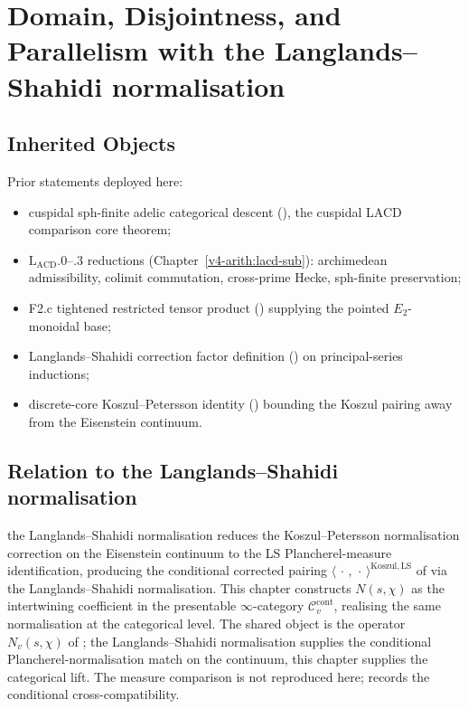 \section{Domain, Disjointness, and Parallelism with the Langlands--Shahidi normalisation}
\label{v4-arith:w6-d:domain}

\subsection{Inherited Objects}

Prior statements deployed here:
\begin{itemize}
\item cuspidal sph-finite adelic categorical descent
(), the cuspidal LACD comparison core
theorem;
\item \(\mathrm{L}_{\mathrm{ACD}}.0\)--.3 reductions
(Chapter~\ref{v4-arith:lacd-sub}): archimedean admissibility,
colimit commutation, cross-prime Hecke, sph-finite preservation;
\item F2.c tightened restricted tensor product
() supplying the pointed
\(E_{2}\)-monoidal base;
\item Langlands--Shahidi correction factor definition
() on principal-series
inductions;
\item discrete-core Koszul--Petersson identity
() bounding the
Koszul pairing away from the Eisenstein continuum.
\end{itemize}

\subsection{Relation to the Langlands--Shahidi normalisation}
\label{v4-arith:w6-d:domain:w6c}

the Langlands--Shahidi normalisation reduces the Koszul--Petersson normalisation correction on the
Eisenstein continuum to the LS Plancherel-measure identification,
producing the conditional corrected pairing
\(\langle\,\cdot\,,\,\cdot\,\rangle^{\mathrm{Koszul},\mathrm{LS}}\)
of  via the Langlands--Shahidi
normalisation. This chapter constructs \(N(s,\chi)\) as the intertwining
coefficient in the presentable \(\infty\)-category
\(\mathcal{C}^{\mathrm{cont}}_{v}\), realising the same normalisation
at the categorical level. The shared object is the operator
\(N_{v}(s,\chi)\) of ; the Langlands--Shahidi normalisation supplies
the conditional Plancherel-normalisation match on the continuum, this chapter supplies
the categorical lift. The measure comparison is not reproduced here;
 records the conditional
cross-compatibility.

